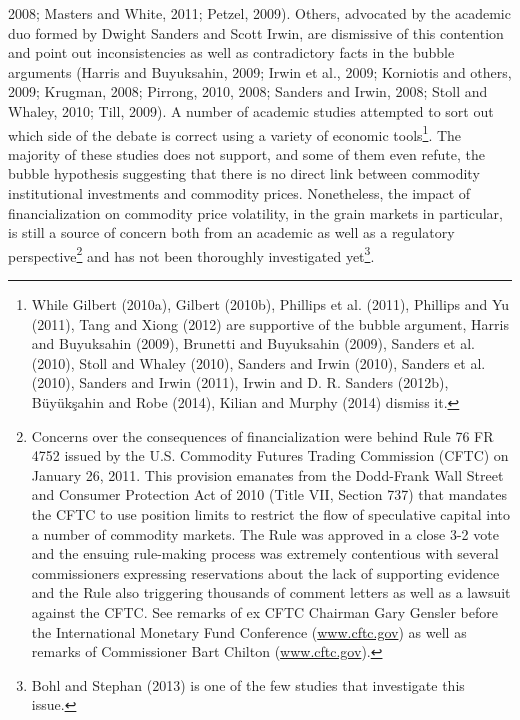 \documentclass[]{elsarticle} %
\begin{document}
2008; Masters and White, 2011; Petzel, 2009). Others, advocated by the
academic duo formed by Dwight Sanders and Scott Irwin, are dismissive of
this contention and point out inconsistencies as well as contradictory
facts in the bubble arguments (Harris and Buyuksahin, 2009; Irwin et
al., 2009; Korniotis and others, 2009; Krugman, 2008; Pirrong, 2010,
2008; Sanders and Irwin, 2008; Stoll and Whaley, 2010; Till, 2009). A
number of academic studies attempted to sort out which side of the
debate is correct using a variety of economic tools\footnote{While
  Gilbert (2010a), Gilbert (2010b), Phillips et al. (2011), Phillips and
  Yu (2011), Tang and Xiong (2012) are supportive of the bubble
  argument, Harris and Buyuksahin (2009), Brunetti and Buyuksahin
  (2009), Sanders et al. (2010), Stoll and Whaley (2010), Sanders and
  Irwin (2010), Sanders et al. (2010), Sanders and Irwin (2011), Irwin
  and D. R. Sanders (2012b), Büyükşahin and Robe (2014), Kilian and
  Murphy (2014) dismiss it.}. The majority of these studies does not
support, and some of them even refute, the bubble hypothesis suggesting
that there is no direct link between commodity institutional investments
and commodity prices. Nonetheless, the impact of financialization on
commodity price volatility, in the grain markets in particular, is still
a source of concern both from an academic as well as a regulatory
perspective\footnote{Concerns over the consequences of financialization
  were behind Rule 76 FR 4752 issued by the U.S. Commodity Futures
  Trading Commission (CFTC) on January 26, 2011. This provision emanates
  from the Dodd-Frank Wall Street and Consumer Protection Act of 2010
  (Title VII, Section 737) that mandates the CFTC to use position limits
  to restrict the flow of speculative capital into a number of commodity
  markets. The Rule was approved in a close 3-2 vote and the ensuing
  rule-making process was extremely contentious with several
  commissioners expressing reservations about the lack of supporting
  evidence and the Rule also triggering thousands of comment letters as
  well as a lawsuit against the CFTC. See remarks of ex CFTC Chairman
  Gary Gensler before the International Monetary Fund Conference
  (\href{http://www.cftc.gov/PressRoom/SpeechesTestimony/opagensler-137}{www.cftc.gov})
  as well as remarks of Commissioner Bart Chilton
  (\href{http://www.cftc.gov/PressRoom/SpeechesTestimony/chiltonstatement022412}{www.cftc.gov}).}
and has not been thoroughly investigated yet\footnote{Bohl and Stephan
  (2013) is one of the few studies that investigate this issue.}.
\end{document}
